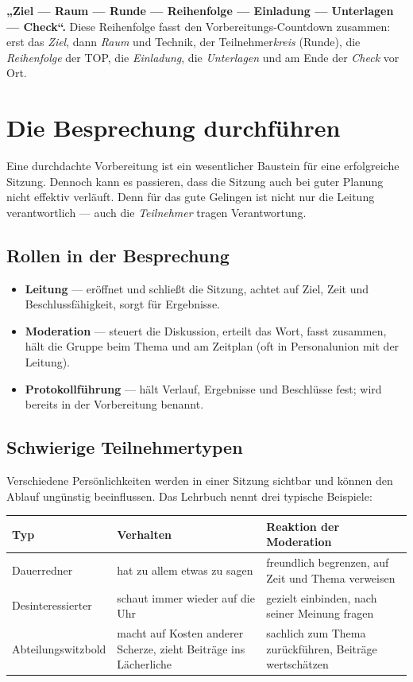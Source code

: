 \documentclass[11pt, a4paper]{article}
\begin{document}
\begin{eselsbruecke}
\textbf{„Ziel --- Raum --- Runde --- Reihenfolge --- Einladung --- Unterlagen --- Check“.}
Diese Reihenfolge fasst den Vorbereitungs-Countdown zusammen: erst das \emph{Ziel}, dann
\emph{Raum} und Technik, der Teilnehmer\emph{kreis} (Runde), die \emph{Reihenfolge} der TOP,
die \emph{Einladung}, die \emph{Unterlagen} und am Ende der \emph{Check} vor Ort.
\end{eselsbruecke}

\section{Die Besprechung durchführen}

Eine durchdachte Vorbereitung ist ein wesentlicher Baustein für eine erfolgreiche Sitzung.
Dennoch kann es passieren, dass die Sitzung auch bei guter Planung nicht effektiv verläuft.
Denn für das gute Gelingen ist nicht nur die Leitung verantwortlich --- auch die
\emph{Teilnehmer} tragen Verantwortung.

\subsection{Rollen in der Besprechung}

\begin{itemize}
  \item \textbf{Leitung} --- eröffnet und schließt die Sitzung, achtet auf Ziel, Zeit und Beschlussfähigkeit, sorgt für Ergebnisse.
  \item \textbf{Moderation} --- steuert die Diskussion, erteilt das Wort, fasst zusammen, hält die Gruppe beim Thema und am Zeitplan (oft in Personalunion mit der Leitung).
  \item \textbf{Protokollführung} --- hält Verlauf, Ergebnisse und Beschlüsse fest; wird bereits in der Vorbereitung benannt.
\end{itemize}

\subsection{Schwierige Teilnehmertypen}

Verschiedene Persönlichkeiten werden in einer Sitzung sichtbar und können den Ablauf
ungünstig beeinflussen. Das Lehrbuch nennt drei typische Beispiele:

\begin{center}
\begin{tabular}{p{3.6cm} p{4.6cm} p{4.6cm}}
\toprule
\textbf{Typ} & \textbf{Verhalten} & \textbf{Reaktion der Moderation}\\
\midrule
Dauerredner & hat zu allem etwas zu sagen & freundlich begrenzen, auf Zeit und Thema verweisen\\
Desinteressierter & schaut immer wieder auf die Uhr & gezielt einbinden, nach seiner Meinung fragen\\
Abteilungswitzbold & macht auf Kosten anderer Scherze, zieht Beiträge ins Lächerliche & sachlich zum Thema zurückführen, Beiträge wertschätzen\\
\bottomrule
\end{tabular}
\end{center}
\end{document}
